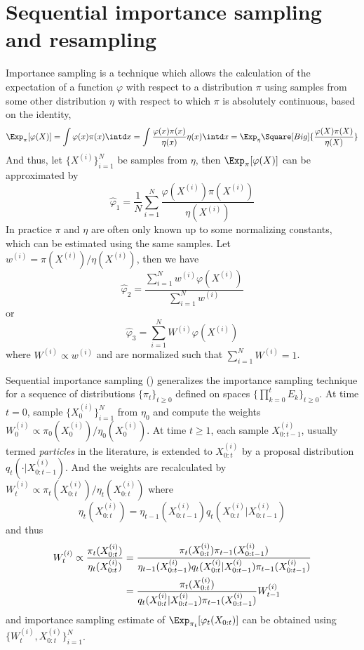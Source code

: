 \section{Sequential importance sampling and resampling}
\label{sec:Sequential importance sampling and resampling}

Importance sampling is a technique which allows the calculation of the
expectation of a function $\varphi$ with respect to a distribution $\pi$ using
samples from some other distribution $\eta$ with respect to which $\pi$ is
absolutely continuous, based on the identity,
\begin{equation}
  \Exp_{\pi}[\varphi(X)]
  = \int\varphi(x)\pi(x)\intd x
  = \int\frac{\varphi(x)\pi(x)}{\eta(x)}\eta(x)\intd x
  = \Exp_{\eta}\Square[Big]{\frac{\varphi(X)\pi(X)}{\eta(X)}}
\end{equation}
And thus, let $\{X^{(i)}\}_{i=1}^N$ be samples from $\eta$, then
$\Exp_{\pi}[\varphi(X)]$ can be approximated by
\begin{equation}
  \hat\varphi_1 =
  \frac{1}{N}\sum_{i=1}^N\frac{\varphi(X^{(i)})\pi(X^{(i)})}{\eta(X^{(i)})}
\end{equation}
In practice $\pi$ and $\eta$ are often only known up to some normalizing
constants, which can be estimated using the same samples. Let $w^{(i)} =
\pi(X^{(i)})/\eta(X^{(i)})$, then we have
\begin{equation}
  \hat\varphi_2 =
  \frac{\sum_{i=1}^Nw^{(i)}\varphi(X^{(i)})}{\sum_{i=1}^Nw^{(i)}}
\end{equation}
or
\begin{equation}
  \hat\varphi_3 = \sum_{i=1}^NW^{(i)}\varphi(X^{(i)})
\end{equation}
where $W^{(i)}\propto w^{(i)}$ and are normalized such that
$\sum_{i=1}^NW^{(i)} = 1$.

Sequential importance sampling (\sis) generalizes the importance sampling
technique for a sequence of distributions $\{\pi_t\}_{t\ge0}$ defined on spaces
$\{\prod_{k=0}^tE_k\}_{t\ge0}$. At time $t = 0$, sample $\{X_0^{(i)}\}_{i=1}^N$
from $\eta_0$ and compute the weights $W_0^{(i)} \propto
\pi_0(X_0^{(i)})/\eta_0(X_0^{(i)})$. At time $t\ge1$, each sample
$X_{0:t-1}^{(i)}$, usually termed \emph{particles} in the literature, is
extended to $X_{0:t}^{(i)}$ by a proposal distribution
$q_t(\cdot|X_{0:t-1}^{(i)})$. And the weights are recalculated by $W_t^{(i)}
\propto \pi_t(X_{0:t}^{(i)})/\eta_t(X_{0:t}^{(i)})$ where
\begin{equation}
  \eta_t(X_{0:t}^{(i)}) =
  \eta_{t-1}(X_{0:t-1}^{(i)})q_t(X_{0:t}^{(i)}|X_{0:t-1}^{(i)})
\end{equation}
and thus
\begin{align}
  W_t^{(i)} \propto \frac{\pi_t(X_{0:t}^{(i)})}{\eta_t(X_{0:t}^{(i)})}
  &= \frac{\pi_t(X_{0:t}^{(i)})\pi_{t-1}(X_{0:t-1}^{(i)})}
  {\eta_{t-1}(X_{0:t-1}^{(i)})q_t(X_{0:t}^{(i)}|X_{0:t-1}^{(i)})
    \pi_{t-1}(X_{0:t-1}^{(i)})} \notag\\
  &= \frac{\pi_t(X_{0:t}^{(i)})}
  {q_t(X_{0:t}^{(i)}|X_{0:t-1}^{(i)})\pi_{t-1}(X_{0:t-1}^{(i)})}W_{t-1}^{(i)}
  \label{eq:si}
\end{align}
and importance sampling estimate of $\Exp_{\pi_t}[\varphi_t(X_{0:t})]$ can be
obtained using $\{W_t^{(i)},X_{0:t}^{(i)}\}_{i=1}^N$.

